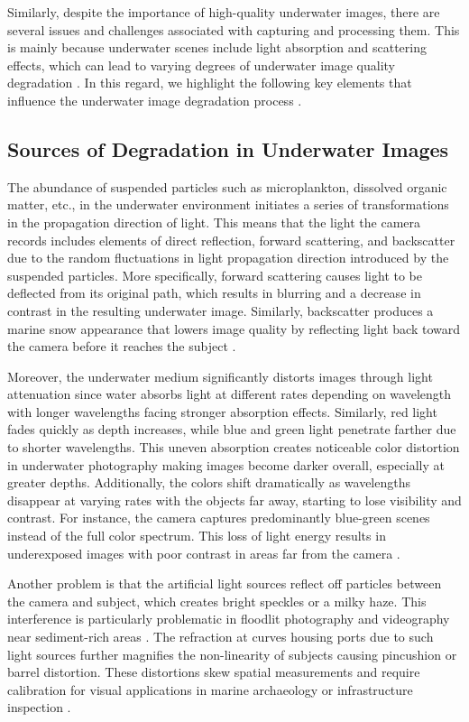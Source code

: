 \documentclass[3p,12pt,authoryear]{elsarticle}
\begin{document}
Similarly, despite the importance of high-quality underwater images, there are several issues and challenges associated with capturing and processing them. This is mainly because underwater scenes include light absorption and scattering effects, which can lead to varying degrees of underwater image quality degradation \cite{a17}. In this regard, we highlight the following key elements that influence the underwater image degradation process \cite{a18}.

\subsection{Sources of Degradation in Underwater Images}
The abundance of suspended particles such as microplankton, dissolved organic matter, etc., in the underwater environment initiates a series of transformations in the propagation direction of light. This means that the light the camera records includes elements of direct reflection, forward scattering, and backscatter due to the random fluctuations in light propagation direction introduced by the suspended particles. More specifically, forward scattering causes light to be deflected from its original path, which results in blurring and a decrease in contrast in the resulting underwater image. Similarly, backscatter produces a marine snow appearance that lowers image quality by reflecting light back toward the camera before it reaches the subject \cite{8578801, 6930829, a19}.

Moreover, the underwater medium significantly distorts images through light attenuation since water absorbs light at different rates depending on wavelength with longer wavelengths facing stronger absorption effects. Similarly, red light fades quickly as depth increases, while blue and green light penetrate farther due to shorter wavelengths. This uneven absorption creates noticeable color distortion in underwater photography making images become darker overall, especially at greater depths. Additionally, the colors shift dramatically as wavelengths disappear at varying rates with the objects far away, starting to lose visibility and contrast. For instance, the camera captures predominantly blue-green scenes instead of the full color spectrum. This loss of light energy results in underexposed images with poor contrast in areas far from the camera \cite{a20, 9711422}.

Another problem is that the artificial light sources reflect off particles between the camera and subject, which creates bright speckles or a milky haze. This interference is particularly problematic in floodlit photography and videography near sediment-rich areas \cite{Li:22, 10.3389/fmars.2023.1163831, isprs-archives-XLVIII-3-2024-1-2024}. The refraction at curves housing ports due to such light sources further magnifies the non-linearity of subjects causing pincushion or barrel distortion. These distortions skew spatial measurements and require calibration for visual applications in marine archaeology or infrastructure inspection \cite{:10.2312/PE/VMV/VMV11/049-056}.
\end{document}
